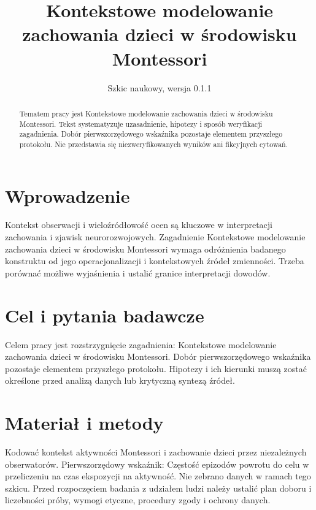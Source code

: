 \documentclass[11pt,a4paper]{article}
\title{Kontekstowe modelowanie zachowania dzieci w środowisku Montessori}
\author{}
\date{Szkic naukowy, wersja 0.1.1}
\begin{document}
\maketitle

\begin{abstract}

Tematem pracy jest Kontekstowe modelowanie zachowania dzieci w środowisku Montessori. Tekst systematyzuje uzasadnienie, hipotezy i sposób weryfikacji zagadnienia. Dobór pierwszorzędowego wskaźnika pozostaje elementem przyszłego protokołu. Nie przedstawia się niezweryfikowanych wyników ani fikcyjnych cytowań.

\end{abstract}

\section{Wprowadzenie}

Kontekst obserwacji i wieloźródłowość ocen są kluczowe w interpretacji zachowania i zjawisk neurorozwojowych. Zagadnienie Kontekstowe modelowanie zachowania dzieci w środowisku Montessori wymaga odróżnienia badanego konstruktu od jego operacjonalizacji i kontekstowych źródeł zmienności. Trzeba porównać możliwe wyjaśnienia i ustalić granice interpretacji dowodów.

\section{Cel i pytania badawcze}

Celem pracy jest rozstrzygnięcie zagadnienia: Kontekstowe modelowanie zachowania dzieci w środowisku Montessori. Dobór pierwszorzędowego wskaźnika pozostaje elementem przyszłego protokołu. Hipotezy i ich kierunki muszą zostać określone przed analizą danych lub krytyczną syntezą źródeł.

\section{Materiał i metody}

Kodować kontekst aktywności Montessori i zachowanie dzieci przez niezależnych obserwatorów. Pierwszorzędowy wskaźnik: Częstość epizodów powrotu do celu w przeliczeniu na czas ekspozycji na aktywność. Nie zebrano danych w ramach tego szkicu. Przed rozpoczęciem badania z udziałem ludzi należy ustalić plan doboru i liczebności próby, wymogi etyczne, procedury zgody i ochrony danych.
\end{document}
